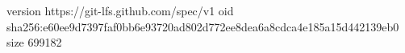 version https://git-lfs.github.com/spec/v1
oid sha256:e60ee9d7397faf0bb6e93720ad802d772ee8dea6a8cdca4e185a15d442139eb0
size 699182
